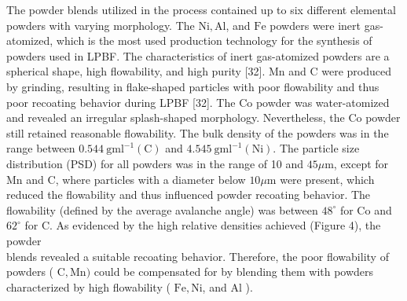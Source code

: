 \documentclass[10pt]{article}
\begin{document}
The powder blends utilized in the process contained up to six different elemental powders with varying morphology. The $\mathrm{Ni}, \mathrm{Al}$, and $\mathrm{Fe}$ powders were inert gas-atomized, which is the most used production technology for the synthesis of powders used in LPBF. The characteristics of inert gas-atomized powders are a spherical shape, high flowability, and high purity [32]. Mn and C were produced by grinding, resulting in flake-shaped particles with poor flowability and thus poor recoating behavior during LPBF [32]. The Co powder was water-atomized and revealed an irregular splash-shaped morphology. Nevertheless, the Co powder still retained reasonable flowability. The bulk density of the powders was in the range between $0.544 \mathrm{~g} \mathrm{ml}^{-1}(\mathrm{C})$ and $4.545 \mathrm{~g} \mathrm{ml}^{-1}(\mathrm{Ni})$. The particle size distribution (PSD) for all powders was in the range of 10 and $45 \mu \mathrm{m}$, except for $\mathrm{Mn}$ and C, where particles with a diameter below $10 \mu \mathrm{m}$ were present, which reduced the flowability and thus influenced powder recoating behavior. The flowability (defined by the average avalanche angle) was between $48^{\circ}$ for $\mathrm{Co}$ and $62^{\circ}$ for $\mathrm{C}$. As evidenced by the high relative densities achieved (Figure 4), the powder\\
blends revealed a suitable recoating behavior. Therefore, the poor flowability of powders ( $\mathrm{C}, \mathrm{Mn})$ could be compensated for by blending them with powders characterized by high flowability ( $\mathrm{Fe}, \mathrm{Ni}$, and $\mathrm{Al}$ ).
\end{document}
